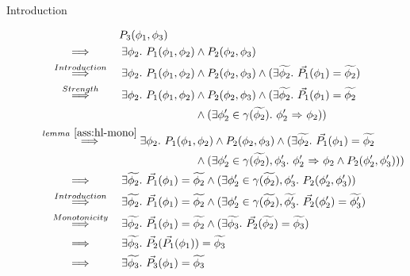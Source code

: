 \begin{proofatend}~
    \begin{description}
        \item[Introduction]
        \begin{align*}
        & \phantom{\overset{}{~\quad\quad\implies\quad\quad~}}~
        P_3(\phi_1, \phi_3)\\
        & \overset{}{~\quad\quad\implies\quad\quad~} 
        \exists \phi_2.~ P_1(\phi_1, \phi_2) \wedge P_2(\phi_2, \phi_3)\\
        & \overset{Introduction}{~\quad\quad\implies\quad\quad~} 
        \exists \phi_2.~ P_1(\phi_1, \phi_2) \wedge P_2(\phi_2, \phi_3)
        \wedge (\exists \grad{\phi_2}.~ \dgrad{P_1}(\phi_1) = \grad{\phi_2})\\
        & \overset{Strength}{~\quad\quad\implies\quad\quad~} 
        \exists \phi_2.~ P_1(\phi_1, \phi_2) \wedge P_2(\phi_2, \phi_3)
        \wedge (\exists \grad{\phi_2}.~ \dgrad{P_1}(\phi_1) = \grad{\phi_2} \\
        & \quad\quad\quad\quad\quad\quad\quad\quad\quad\quad\quad\quad\quad\quad
        \wedge 
        (\exists \phi_2' \in \gamma(\grad{\phi_2}).~ \phiImplies{\phi_2'}{\phi_2}))\\
        & \overset{lemma~\ref{ass:hl-mono}}{~\quad\quad\implies\quad\quad~} 
        \exists \phi_2.~ P_1(\phi_1, \phi_2) \wedge P_2(\phi_2, \phi_3)
        \wedge (\exists \grad{\phi_2}.~ \dgrad{P_1}(\phi_1) = \grad{\phi_2} \\
        & \quad\quad\quad\quad\quad\quad\quad\quad\quad\quad\quad\quad\quad\quad
        \wedge 
        (\exists \phi_2' \in \gamma(\grad{\phi_2}), \phi_3'.~ \phiImplies{\phi_2'}{\phi_2} \wedge P_2(\phi_2', \phi_3')))\\
        & \overset{}{~\quad\quad\implies\quad\quad~} 
        \exists \grad{\phi_2}.~ \dgrad{P_1}(\phi_1) = \grad{\phi_2} \wedge 
        (\exists \phi_2' \in \gamma(\grad{\phi_2}), \phi_3'.~ P_2(\phi_2', \phi_3'))\\
        & \overset{Introduction}{~\quad\quad\implies\quad\quad~} 
        \exists \grad{\phi_2}.~ \dgrad{P_1}(\phi_1) = \grad{\phi_2} \wedge 
        (\exists \phi_2' \in \gamma(\grad{\phi_2}), \grad{\phi_3'}.~ \dgrad{P_2}(\phi_2') = \grad{\phi_3'})\\
        & \overset{Monotonicity}{~\quad\quad\implies\quad\quad~} 
        \exists \grad{\phi_2}.~ \dgrad{P_1}(\phi_1) = \grad{\phi_2} \wedge 
        (\exists \grad{\phi_3}.~ \dgrad{P_2}(\grad{\phi_2}) = \grad{\phi_3})\\
        & \overset{}{~\quad\quad\implies\quad\quad~} 
        \exists \grad{\phi_3}.~ \dgrad{P_2}(\dgrad{P_1}(\phi_1)) = \grad{\phi_3}\\
        & \overset{}{~\quad\quad\implies\quad\quad~} 
        \exists \grad{\phi_3}.~ \dgrad{P_3}(\phi_1) = \grad{\phi_3}
        \end{align*}
        

\end{description}
\end{proofatend}
